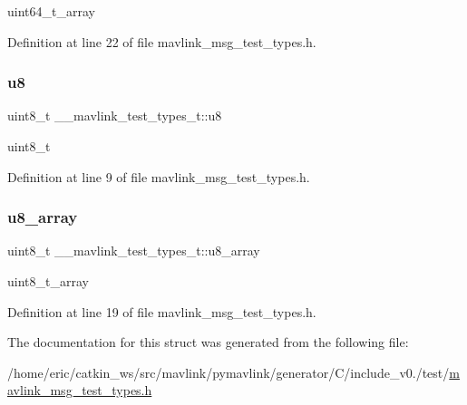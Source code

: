 uint64\+\_\+t\+\_\+array 



Definition at line 22 of file mavlink\+\_\+msg\+\_\+test\+\_\+types.\+h.

\mbox{\label{struct____mavlink__test__types__t_a2e20758d4738b63791dbb565f4134a59}} 
\subsubsection{\texorpdfstring{u8}{u8}}
{\footnotesize\ttfamily uint8\+\_\+t \+\_\+\+\_\+mavlink\+\_\+test\+\_\+types\+\_\+t\+::u8}



uint8\+\_\+t 



Definition at line 9 of file mavlink\+\_\+msg\+\_\+test\+\_\+types.\+h.

\mbox{\label{struct____mavlink__test__types__t_aa9e9f7fbdae69fb84fa7c85c1af20ba7}} 
\subsubsection{\texorpdfstring{u8\_array}{u8\_array}}
{\footnotesize\ttfamily uint8\+\_\+t \+\_\+\+\_\+mavlink\+\_\+test\+\_\+types\+\_\+t\+::u8\+\_\+array}



uint8\+\_\+t\+\_\+array 



Definition at line 19 of file mavlink\+\_\+msg\+\_\+test\+\_\+types.\+h.



The documentation for this struct was generated from the following file\+:\begin{DoxyCompactItemize}
\item 
/home/eric/catkin\+\_\+ws/src/mavlink/pymavlink/generator/\+C/include\+\_\+v0./test/\mbox{\hyperlink{include__v0_89_2test_2mavlink__msg__test__types_8h}{mavlink\+\_\+msg\+\_\+test\+\_\+types.\+h}}\end{DoxyCompactItemize}
